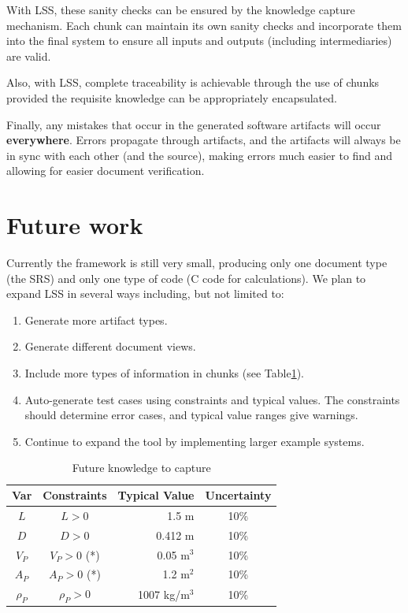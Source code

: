 \documentclass{sig-alternate-05-2015}
\newcommand{\lss}{LSS}
\begin{document}
With \lss, these sanity checks can be ensured by the knowledge capture
mechanism. Each chunk can maintain its own sanity checks and incorporate them
into the final system to ensure all inputs and outputs (including
intermediaries) are valid.

Also, with \lss{}, complete traceability is achievable through the use of chunks
provided the requisite knowledge can be appropriately encapsulated.

Finally, any mistakes that occur in the generated software artifacts will occur
\textbf{everywhere}. Errors propagate through artifacts, and the artifacts will
always be in sync with each other (and the source), making errors much easier to
find and allowing for easier document verification.

\section{Future work} \label{sec:todo}

Currently the framework is still very small, producing only one document type
(the SRS) and only one type of code (C code for calculations). We plan to expand
\lss{} in several ways including, but not limited to:

\begin{enumerate}
\item Generate more artifact types. %
\item Generate different document views. %
\item Include more types of information in chunks (see Table\ref{tab:pcm}).
\item Auto-generate test cases using constraints and typical values. The
  constraints should determine error cases, and typical value ranges give
  warnings.
\item Continue to expand the tool by implementing larger example systems.
\end{enumerate}

\begin{table} \label{tab:pcm}
\centering
\caption{Future knowledge to capture}
\begin{tabular}{|c|c|r|c|} \hline
\textbf{Var} & \textbf{Constraints} & \textbf{Typical Value} & \textbf{Uncertainty}\\ \hline
$L$ & $L > 0$ & 1.5 m & 10\% \\ \hline
$D$ & $D > 0$ & 0.412 m & 10\% \\ \hline
$V_P$ & $V_P > 0$ (*)	& 0.05 m$^3$	& 10\% \\ \hline
$A_P$ & $A_P > 0$ (*)	& 1.2 m$^2$	& 10\% \\ \hline
$\rho_P$ & $\rho_P > 0$	& 1007 kg/m$^3$	& 10\% \\
\hline\end{tabular}
\end{table}
\end{document}
